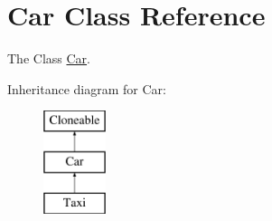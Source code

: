 \hypertarget{class_car}{\section{Car Class Reference}
\label{class_car}
}


The Class \hyperlink{class_car}{Car}.  


Inheritance diagram for Car\+:\begin{figure}[H]
\begin{center}
\leavevmode
\includegraphics[height=3.000000cm]{class_car}
\end{center}
\end{figure}
